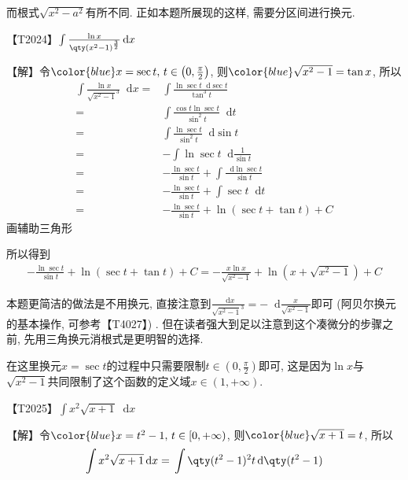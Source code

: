 \documentclass{ctexbook}
\newcommand*{\dif}{\mathop{}\!\mathrm{d}}
\begin{document}
{{而根式$\sqrt{x^{2}-a^{2}}$有所不同. 正如本题所展现的这样, 需要分区间进行换元. \par}
{\color{red}【T2024】}$\int\frac{\ln{x}}{\qty(x^{2}-1)^{\frac{3}{2}}}\dif{x}$\par
【解】令$\color{blue}x=\sec{t},\,t\in\left(0,\frac{\pi}{2}\right)$, 则$\color{blue}\sqrt{x^{2}-1}=\tan{x}$, 所以
\begin{align*}
\int\frac{\ln{x}}{\sqrt{x^{2}-1}^{3}}\dif{x}={}&\int\frac{\ln{\sec{t}}\dif{\sec{t}}}{\tan^{3}{t}}\\
={}&\int\frac{\cos{t}\ln{\sec{t}}}{\sin^{2}{t}}\dif{t}\\
={}&\int\frac{\ln{\sec{t}}}{\sin^{2}{t}}\dif{\sin{t}}\\
={}&-\int\ln{\sec{t}}\dif{\frac{1}{\sin{t}}}\\
={}&-\frac{\ln{\sec{t}}}{\sin{t}}+\int\frac{\dif{\ln{\sec{t}}}}{\sin{t}}\\
={}&-\frac{\ln{\sec{t}}}{\sin{t}}+\int\sec{t}\dif{t}\\
={}&-\frac{\ln{\sec{t}}}{\sin{t}}+\ln(\sec{t}+\tan{t})+C
\end{align*}
画辅助三角形
\begin{center}
\end{center}
所以得到
\begin{align*}
-\frac{\ln{\sec{t}}}{\sin{t}}+\ln(\sec{t}+\tan{t})+C=-\frac{x\ln{x}}{\sqrt{x^{2}-1}}+\ln(x+\sqrt{x^{2}-1})+C
\end{align*}\par
{\kaishu 本题更简洁的做法是不用换元, 直接注意到$\frac{\dif{x}}{\sqrt{x^{2}-1}^{3}}=-\dif{\frac{x}{\sqrt{x^{2}-1}}}$即可 (阿贝尔换元的基本操作, 可参考【T4027】) . 但在读者强大到足以注意到这个凑微分的步骤之前, 先用三角换元消根式是更明智的选择. \par
在这里换元$x=\sec{t}$的过程中只需要限制$t\in\left(0,\frac{\pi}{2}\right)$即可, 这是因为$\ln{x}$与$\sqrt{x^{2}-1}$共同限制了这个函数的定义域$x\in\left(1,+\infty\right)$. \par}
{\color{red}【T2025】}$\int x^{2}\sqrt{x+1}\dif{x}$\par
【解】令$\color{blue}x=t^{2}-1,\,t\in\left[0,+\infty\right)$, 则$\color{blue}\sqrt{x+1}=t$, 所以
\begin{align*}
\int x^{2}\sqrt{x+1}\dif{x}={}&\int\qty(t^{2}-1)^{2}t\dif{\qty(t^{2}-1)}\\

\end{align*}}
\end{document}
